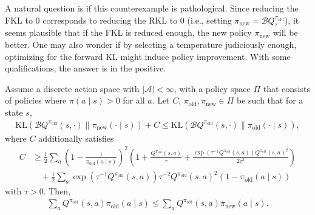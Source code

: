 \documentclass[twoside,11pt]{article}
\newcommand{\actionspace}{\mathcal{A}}
\newcommand{\KL}{\mathrm{KL}}
\newcommand{\boltzmannQ}{\mathcal{B}Q}
\newcommand{\pinew}{{\pi_\mathrm{new}}}
\newcommand{\piold}{{\pi_\mathrm{old}}}
\begin{document}
A natural question is if this counterexample is pathological. Since reducing the FKL to 0 corresponds to reducing the RKL to 0 (i.e., setting $\pinew = \boltzmannQ^\piold_\tau$), it seems plausible that if the FKL is reduced enough, the new policy $\pinew$ will be better. One may also wonder if by selecting a temperature judiciously enough, optimizing for the forward KL might induce policy improvement. With some qualifications, the answer is in the positive. 
%
\begin{proposition}\label{prop:forward-kl-surrogate-2}
Assume a discrete action space with $|\actionspace| < \infty$, with a policy space $\Pi$ that consists of policies where $\pi(a \mid s) > 0$ for all $a$. Let $C$, $\piold, \pinew \in \Pi$ be such that for a state $s$,
\begin{align}\label{eq:forward-improvement}
    \KL(\boltzmannQ^{\piold}(s, \cdot) \parallel \pinew (\cdot \mid s)) + C \leq \KL(\boltzmannQ^{\piold}(s, \cdot) \parallel \piold(\cdot \mid s)),
\end{align}
where $C$ additionally satisfies
\begin{align*}
    C &\geq  \frac{1}{2}\sum_a  \left(1 - \frac{1}{\piold(a \mid s)}\right)^2 \left(1 + \frac{Q^\piold(s, a)}{\tau} + \frac{\exp(\tau^{-1} Q^\piold(s, a)) Q^\piold(s, a)^2}{2\tau^2}\right) \\
    &\quad + \frac{1}{2} \sum_a \exp(\tau^{-1} Q^\piold(s, a)) \tau^{-2} Q^\piold(s, a)^2 (1 - \piold(a \mid s))
\end{align*}
with $\tau > 0$. Then,
\begin{align*}
    \sum_a Q^{\piold}(s, a) \piold(a \mid s) \leq \sum_a Q^{\piold}(s, a) \pinew(a \mid s). 
\end{align*}
\end{proposition}
\end{document}

